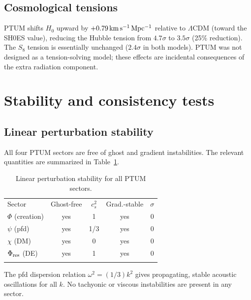 \documentclass[epj]{svjour}
\begin{document}
\subsection{Cosmological tensions}

PTUM shifts \(H_0\) upward by
\(+0.79\,{\rm km\,s^{-1}\,Mpc^{-1}}\) relative to \(\Lambda\)CDM
(toward the SH0ES value), reducing the Hubble tension from
\(4.7\sigma\) to \(3.5\sigma\) (25\% reduction). The \(S_8\)
tension is essentially unchanged (\(2.4\sigma\) in both models).
PTUM was not designed as a tension-solving model; these effects are
incidental consequences of the extra radiation component.

\section{Stability and consistency tests}
\label{sec:stability}

\subsection{Linear perturbation stability}

All four PTUM sectors are free of ghost and gradient instabilities.
The relevant quantities are summarized in Table~\ref{tab:stability}.

\begin{table}
\caption{Linear perturbation stability for all PTUM sectors.}
\label{tab:stability}
\centering
\begin{tabular}{lcccc}
\hline\noalign{\smallskip}
Sector & Ghost-free & \(c_s^2\) & Grad.-stable & \(\sigma\) \\
\noalign{\smallskip}\hline\noalign{\smallskip}
\(\Phi\) (creation)     & yes & 1   & yes & 0 \\
\(\psi\) (pfd)          & yes & 1/3 & yes & 0 \\
\(\chi\) (DM)           & yes & 0   & yes & 0 \\
\(\Phi_{\rm res}\) (DE) & yes & 1   & yes & 0 \\
\noalign{\smallskip}\hline
\end{tabular}
\end{table}

The pfd dispersion relation \(\omega^2=(1/3)k^2\) gives propagating,
stable acoustic oscillations for all \(k\). No tachyonic or
viscous instabilities are present in any sector.
\end{document}
